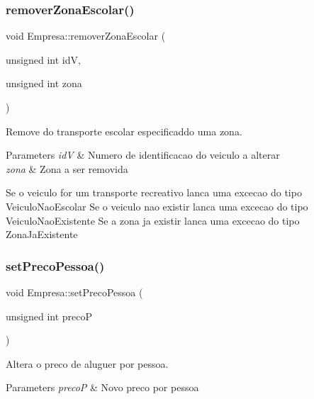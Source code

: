 \subsubsection{\texorpdfstring{remover\+Zona\+Escolar()}{removerZonaEscolar()}}
{\footnotesize\ttfamily void Empresa\+::remover\+Zona\+Escolar (\begin{DoxyParamCaption}\item[{unsigned int}]{idV,  }\item[{unsigned int}]{zona }\end{DoxyParamCaption})}



Remove do transporte escolar especificaddo uma zona. 


\begin{DoxyParams}{Parameters}
{\em idV} & Numero de identificacao do veiculo a alterar \\
\hline
{\em zona} & Zona a ser removida\\
\hline
\end{DoxyParams}
Se o veiculo for um transporte recreativo lanca uma excecao do tipo Veiculo\+Nao\+Escolar Se o veiculo nao existir lanca uma excecao do tipo Veiculo\+Nao\+Existente Se a zona ja existir lanca uma excecao do tipo Zona\+Ja\+Existente \mbox{\label{class_empresa_aa2ecc54f025070f55e013dd439c22936}} 
\subsubsection{\texorpdfstring{set\+Preco\+Pessoa()}{setPrecoPessoa()}}
{\footnotesize\ttfamily void Empresa\+::set\+Preco\+Pessoa (\begin{DoxyParamCaption}\item[{unsigned int}]{precoP }\end{DoxyParamCaption})}



Altera o preco de aluguer por pessoa. 


\begin{DoxyParams}{Parameters}
{\em precoP} & Novo preco por pessoa \\
\hline
\end{DoxyParams}
\mbox{\label{class_empresa_aad5017fad374ed1cc8f25016cc5b4eb5}} 
